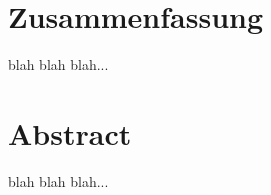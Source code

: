  
\chapter{Zusammenfassung}

   blah blah blah...
 
 {\let\clearpage\relax\chapter*{Abstract}}
   blah blah blah...
